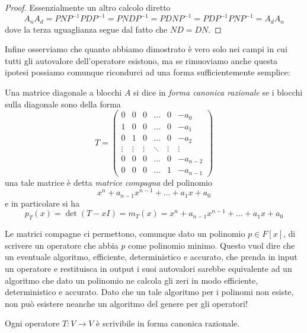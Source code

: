 \documentclass[11pt]{scrartcl}
\begin{document}
   	 \begin{proof}
   	 	Essenzialmente un altro calcolo diretto
   	 	$$A_nA_d=PNP^{-1}PDP^{-1}=PNDP^{-1}=PDNP^{-1}=PDP^{-1}PNP^{-1}=A_dA_n$$
   	 	dove la terza uguaglianza segue dal fatto che $ND=DN$.
   	 \end{proof}
   	 Infine osserviamo che quanto abbiamo dimostrato è vero solo nei campi in cui tutti gli autovalore dell'operatore esistono, ma se rimuoviamo anche questa ipotesi possiamo comunque ricondurci ad una forma sufficientemente semplice:
   	 \begin{definition}
   	 	Una matrice diagonale a blocchi $A$ si dice in \textit{forma canonica razionale} se i blocchi sulla diagonale sono della forma
   	 	$$T=
   	 	\begin{pmatrix}
   	 		0 & 0 & 0 & \dots & 0 & -a_0 \\
   	 		1 & 0 & 0 & \dots & 0 & -a_1 \\
   	 		0 & 1 & 0 & \dots & 0 & -a_2 \\
   	 		\vdots & \vdots & \vdots & \ddots & \vdots & \vdots \\
   	 		0 & 0 & 0 & \dots & 0 & -a_{n-2} \\
   	 		0 & 0 & 0 & \dots & 1 & -a_{n-1}
   	 	\end{pmatrix}
   	 	$$
   	 	una tale matrice è detta \textit{matrice compagna} del polinomio 
   	 	$$x^n+a_{n-1}x^{n-1}+\dots+a_1x+a_0$$
   	 	e in particolare si ha
   	 	$$p_T(x)=\det\left(T-xI\right)=m_T(x)=x^n+a_{n-1}x^{n-1}+\dots+a_1x+a_0$$
   	 \end{definition}
   	 \begin{remark}
   	 	Le matrici compagne ci permettono, comunque dato un polinomio $p\in F[x]$, di scrivere un operatore che abbia $p$ come polinomio minimo. Questo vuol dire che un eventuale algoritmo, efficiente, deterministico e accurato, che prenda in input un operatore e restituisca in output i suoi autovalori sarebbe equivalente ad un algoritmo che dato un polinomio ne calcola gli zeri in modo efficiente, deterministico e accurato. Dato che un tale algoritmo per i polinomi non esiste, non può esistere neanche un algoritmo del genere per gli operatori!
   	 \end{remark}
   	 \begin{theorem}[Frobenius]
   	 	Ogni operatore $T:V\to V$ è scrivibile in forma canonica razionale.
   	 \end{theorem}
\end{document}
